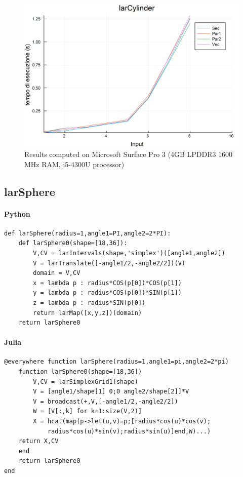 \documentclass{article}
\begin{document}
\begin{figure}[htbp] 
\centering 
\includegraphics[scale=.13]{larCylinderTime.png} 
\caption{Results computed on Microsoft Surface Pro  3 (4GB LPDDR3 1600 MHz RAM, i5-4300U processor)} 
\end{figure}

\subsection{larSphere}

\paragraph{Python}

\begin{verbatim}
def larSphere(radius=1,angle1=PI,angle2=2*PI):
    def larSphere0(shape=[18,36]):
        V,CV = larIntervals(shape,'simplex')([angle1,angle2])
        V = larTranslate([-angle1/2,-angle2/2])(V)
        domain = V,CV
        x = lambda p : radius*COS(p[0])*COS(p[1])
        y = lambda p : radius*COS(p[0])*SIN(p[1])
        z = lambda p : radius*SIN(p[0])
        return larMap([x,y,z])(domain)
    return larSphere0
\end{verbatim}

\paragraph{Julia}

\begin{verbatim}
@everywhere function larSphere(radius=1,angle1=pi,angle2=2*pi)
    function larSphere0(shape=[18,36])
        V,CV = larSimplexGrid1(shape)
        V = [angle1/shape[1] 0;0 angle2/shape[2]]*V
        V = broadcast(+,V,[-angle1/2,-angle2/2])
        W = [V[:,k] for k=1:size(V,2)]
        X = hcat(map(p->let(u,v)=p;[radius*cos(u)*cos(v);
        	radius*cos(u)*sin(v);radius*sin(u)]end,W)...) 
    return X,CV
    end
    return larSphere0    
end
\end{verbatim}
\end{document}
